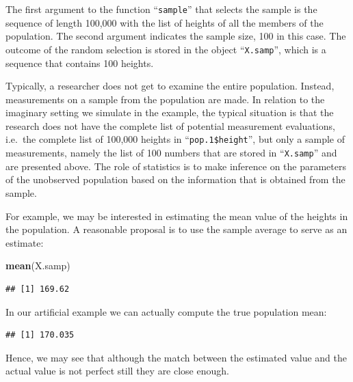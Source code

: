 \documentclass[]{krantz}
\makeatletter
\newenvironment{Shaded}{\begin{snugshade}}{\end{snugshade}}
\newcommand{\KeywordTok}[1]{\textcolor[rgb]{0.13,0.29,0.53}{\textbf{#1}}}
\newcommand{\DecValTok}[1]{\textcolor[rgb]{0.00,0.00,0.81}{#1}}
\newcommand{\OperatorTok}[1]{\textcolor[rgb]{0.81,0.36,0.00}{\textbf{#1}}}
\newcommand{\NormalTok}[1]{#1}
\newenvironment{kframe}{%
\medskip{}
\setlength{\fboxsep}{.8em}
 \def\at@end@of@kframe{}%
 \ifinner\ifhmode%
  \def\at@end@of@kframe{\end{minipage}}%
  \begin{minipage}{\columnwidth}%
 \fi\fi%
 \def\FrameCommand##1{\hskip\@totalleftmargin \hskip-\fboxsep
 \colorbox{shadecolor}{##1}\hskip-\fboxsep
     \hskip-\linewidth \hskip-\@totalleftmargin \hskip\columnwidth}%
 \MakeFramed {\advance\hsize-\width
   \@totalleftmargin\z@ \linewidth\hsize
   \@setminipage}}%
 {\par\unskip\endMakeFramed%
 \at@end@of@kframe}
\renewenvironment{Shaded}{\begin{kframe}}{\end{kframe}}
\theoremstyle{definition}
\theoremstyle{definition}
\theoremstyle{definition}
\theoremstyle{remark}
\makeatother
\begin{document}
The first argument to the function ``\texttt{sample}'' that selects the
sample is the sequence of length 100,000 with the list of heights of all
the members of the population. The second argument indicates the sample
size, 100 in this case. The outcome of the random selection is stored in
the object ``\texttt{X.samp}'', which is a sequence that contains 100
heights.

Typically, a researcher does not get to examine the entire population.
Instead, measurements on a sample from the population are made. In
relation to the imaginary setting we simulate in the example, the
typical situation is that the research does not have the complete list
of potential measurement evaluations, i.e.~the complete list of 100,000
heights in ``\texttt{pop.1\$height}'', but only a sample of
measurements, namely the list of 100 numbers that are stored in
``\texttt{X.samp}'' and are presented above. The role of statistics is
to make inference on the parameters of the unobserved population based
on the information that is obtained from the sample.

For example, we may be interested in estimating the mean value of the
heights in the population. A reasonable proposal is to use the sample
average to serve as an estimate:

\begin{Shaded}
\begin{Highlighting}[]
\KeywordTok{mean}\NormalTok{(X.samp)}
\end{Highlighting}
\end{Shaded}

\begin{verbatim}
## [1] 169.62
\end{verbatim}

In our artificial example we can actually compute the true population
mean:

\begin{Shaded}
\end{Shaded}

\begin{verbatim}
## [1] 170.035
\end{verbatim}

Hence, we may see that although the match between the estimated value
and the actual value is not perfect still they are close enough.
\end{document}
